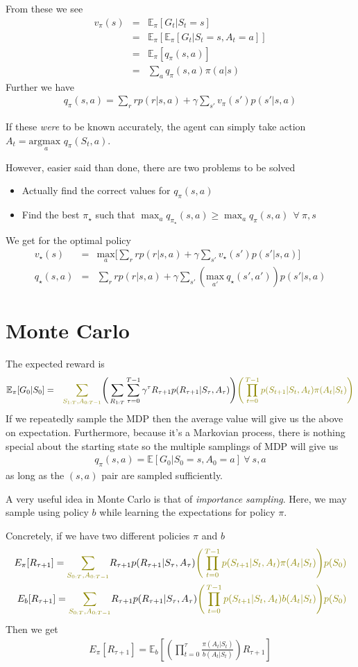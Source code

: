 \documentclass[11pt,a4paper]{article}
\newcommand\bea{\begin{eqnarray}}
\newcommand\eea{\end{eqnarray}}
\newcommand{\nn}{\nonumber \\}
\newcommand{\e}[2]{\mathbb E_{#2}[#1]}
\newcommand{\partitionfunctionintegrand}{{\color{olive} \Bigg(  \prod_{t=0}^{T-1} p(S_{t+1}|S_t,A_t) \pi(A_t|S_t) \Bigg) p(S_0) }}
\newcommand{\partitionfunctionintegrandBehaviourial}{{\color{olive} \Bigg(  \prod_{t=0}^{T-1} p(S_{t+1}|S_t,A_t) b(A_t|S_t) \Bigg) p(S_0) }}
\newcommand{\partitionfunctionintegral}{{\color{olive} \sum_{S_{0:T}, A_{0:T-1}}}}
\newcommand{\partitionfunctionintegrandsecond}{{\color{olive} \Bigg(  \prod_{t=0}^{T-1} p(S_{t+1}|S_t,A_t) \pi(A_t|S_t) \Bigg) }}
\newcommand{\partitionfunctionintegralsecond}{{\color{olive} \sum_{S_{1:T}, A_{0:T-1}}}}
\newcommand{\argmax}[1]{\underset{#1}{\text{argmax }}}
\begin{document}
From these we see
\bea
v_\pi(s) &=&  \e{G_t|S_t=s}{\pi} \nn
&=& \e{\e{G_t|S_t=s,A_t=a}{\pi} }{\pi} \nn
&=& \e{q_\pi(s,a)}{\pi} \nn
&=& \sum_a q_\pi(s,a) \pi(a|s)
\eea
Further we have
\bea
q_\pi(s,a) = \sum_r r p(r|s,a) + \gamma \sum_{s'} v_\pi(s') p(s'|s,a)
\eea


If these {\em were} to be known accurately, the agent can simply take action $A_t = \argmax{a} q_\pi(S_t,a)$. 

However, easier said than done, there are two problems to be solved
\begin{itemize}
\item Actually find the correct values for $q_\pi(s,a)$
\item Find the best $\pi_\star$ such that $\max_a q_{\pi_\star}(s,a) \ge \max_a q_\pi(s,a)~~ \forall ~\pi,s$
\end{itemize}
We get for the optimal policy
\bea
v_\star(s) &=&\underset{a}{\text{max}}  \Bigg[\sum_r r p(r|s,a) + \gamma \sum_{s'} v_\star(s') p(s'|s,a) \Bigg]  \\
q_\star(s,a) &=& \sum_r r p(r|s,a)  + \gamma \sum_{s'} \left( \underset{a'}{\text{max}} ~q_\star(s',a') \right)p(s'|s,a)
\eea






\section{Monte Carlo} \label{sec:monte_carlo}

The expected reward is
\bea
\mathbb E_\pi[G_0|S_0] &=& \partitionfunctionintegralsecond  \Bigg( \sum_{R_{1:T}} \sum_{\tau=0}^{T-1} \gamma^\tau R_{\tau+1} p(R_{\tau+1}| S_\tau,A_\tau) \Bigg) \partitionfunctionintegrandsecond  \nn
\eea
If we repeatedly sample the MDP then the average value will give us the above on expectation. Furthermore, because it's a Markovian process, there is nothing special about the starting state so the multiple samplings of MDP will give us 
\bea
q_\pi(s,a) = \mathbb E[G_0|S_0 = s,A_0=a]~\forall~s,a
\eea
as long as the $(s,a)$ pair are sampled sufficiently.


A very useful idea in Monte Carlo is that of {\em importance sampling}. Here, we may sample using policy $b$ while learning the expectations for policy $\pi$. 

Concretely, if we have two different policies $\pi$ and $b$ 
\bea
E_\pi[R_{\tau+1}]  = \partitionfunctionintegral  R_{\tau+1} p(R_{\tau+1}|S_\tau,A_\tau) \partitionfunctionintegrand \nn
E_b[R_{\tau+1}]  = \partitionfunctionintegral R_{\tau+1} p(R_{\tau+1}|S_\tau,A_\tau) \partitionfunctionintegrandBehaviourial \nn
\eea
Then we get 
\bea
E_\pi[R_{\tau+1}] =\mathbb E_{b}[ \left( \prod_{t=0}^{\tau} \frac{\pi(A_{t} | S_{t} )}{b(A_{t} | S_{t} )} \right)   R_{\tau+1}] 
\eea
\end{document}
